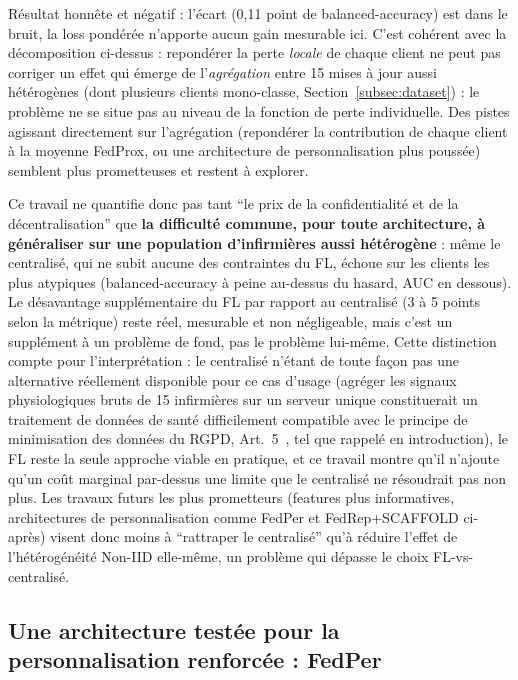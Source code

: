 \documentclass{article}
\begin{document}
Résultat honnête et négatif : l'écart (0,11 point de balanced-accuracy) est dans le
bruit, la loss pondérée n'apporte aucun gain mesurable ici. C'est cohérent avec la
décomposition ci-dessus : repondérer la perte \emph{locale} de chaque client ne peut
pas corriger un effet qui émerge de l'\emph{agrégation} entre 15 mises à jour aussi
hétérogènes (dont plusieurs clients mono-classe, Section~\ref{subsec:dataset}) : le
problème ne se situe pas au niveau de la fonction de perte individuelle. Des pistes
agissant directement sur l'agrégation (repondérer la contribution de chaque client à
la moyenne FedProx, ou une architecture de personnalisation plus poussée) semblent plus
prometteuses et restent à explorer.

Ce travail ne quantifie donc pas tant ``le prix de la confidentialité et de la
décentralisation'' que \textbf{la difficulté commune, pour toute architecture, à
généraliser sur une population d'infirmières aussi hétérogène} : même le centralisé,
qui ne subit aucune des contraintes du FL, échoue sur les clients les plus atypiques
(balanced-accuracy à peine au-dessus du hasard, AUC en dessous). Le désavantage
supplémentaire du FL par rapport au centralisé (3 à 5 points selon la métrique) reste
réel, mesurable et non négligeable, mais c'est un supplément à un problème de fond,
pas le problème lui-même. Cette distinction compte pour l'interprétation : le centralisé
n'étant de toute façon pas une alternative réellement disponible pour ce cas d'usage
(agréger les signaux physiologiques bruts de 15 infirmières sur un serveur unique
constituerait un traitement de données de santé difficilement compatible avec le
principe de minimisation des données du RGPD, Art.~5~\cite{gdpr2016}, tel que rappelé
en introduction), le FL reste la seule approche viable en pratique, et ce travail
montre qu'il n'ajoute qu'un coût marginal par-dessus une limite que le centralisé ne
résoudrait pas non plus. Les travaux futurs les plus prometteurs (features plus
informatives, architectures de personnalisation comme FedPer et FedRep+SCAFFOLD ci-après)
visent donc moins à ``rattraper le centralisé'' qu'à réduire l'effet de l'hétérogénéité
Non-IID elle-même, un problème qui dépasse le choix FL-vs-centralisé.

\subsection{Une architecture testée pour la personnalisation renforcée : FedPer}
\label{subsec:fedper}
\end{document}
